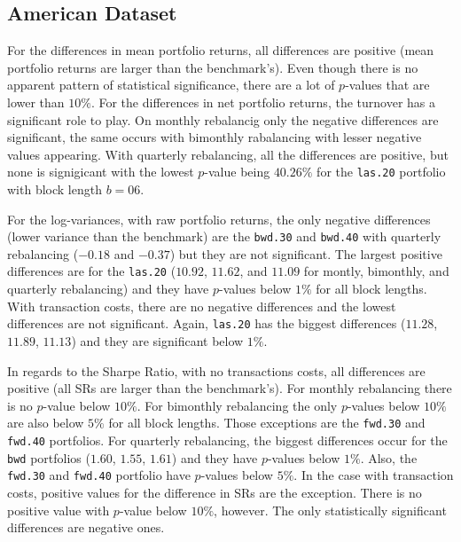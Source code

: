 \documentclass[12pt,oneside,a4paper]{memoir}
\begin{document}
\subsection{American Dataset} 

For the differences in mean portfolio returns, all differences are positive (mean portfolio returns are larger than the benchmark's).
Even though there is no apparent pattern of statistical significance, there are a lot of $p$-values that are lower than $10\%$.
For the differences in net portfolio returns, the turnover has a significant role to play.
On monthly rebalancig only the negative differences are significant, the same occurs with bimonthly rabalancing with lesser negative values appearing.
With quarterly rebalancing, all the differences are positive, but none is signigicant with the lowest $p$-value being $40.26\%$ for the \texttt{las.20} portfolio with block length $b=06$. 

For the log-variances, with raw portfolio returns, the only negative differences (lower variance than the benchmark) are the \texttt{bwd.30} and \texttt{bwd.40} with quarterly rebalancing ($-0.18$ and $-0.37$) but they are not significant.
The largest positive differences are for the \texttt{las.20} ($10.92$, $11.62$, and $11.09$ for montly, bimonthly, and quarterly rebalancing) and they have $p$-values below $1\%$ for all block lengths.
With transaction costs, there are no negative differences and the lowest differences are not significant.
Again, \texttt{las.20} has the biggest differences ($11.28$, $11.89$, $11.13$) and they are significant below $1\%$.

In regards to the Sharpe Ratio, with no transactions costs, all differences are positive (all SRs are larger than the benchmark's).
For monthly rebalancing there is no $p$-value below $10\%$.
For bimonthly rebalancing the only $p$-values below $10\%$ are also below $5\%$ for all block lengths.
Those exceptions are the \texttt{fwd.30} and \texttt{fwd.40} portfolios.
For quarterly rebalancing, the biggest differences occur for the \texttt{bwd} portfolios ($1.60$, $1.55$, $1.61$) and they have $p$-values below $1\%$.
Also, the \texttt{fwd.30} and \texttt{fwd.40} portfolio have $p$-values below $5\%$.
In the case with transaction costs, positive values for the difference in SRs are the exception.
There is no positive value with $p$-value below $10\%$, however.
The only statistically significant differences are negative ones.
\end{document}
